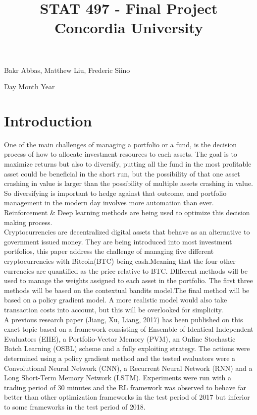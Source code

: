 \documentclass[a4paper,12pt]{article}
\title{
{STAT 497 - Final Project} \\
{\large Concordia University} \\
}
\date{}
\begin{document}
\begin{titlingpage}
  \maketitle
  \centering
  \vfill
  {\large{Bakr Abbas, Matthew Liu, Frederic Siino}} \par
  {\large{Day Month Year}}
\end{titlingpage}

\newpage

\section{Introduction}
One of the main challenges of managing a portfolio or a fund, is the decision process of how to allocate investment resources to each assets. The goal is to maximize returns but also to diversify, putting all the fund in the most profitable asset could be beneficial in the short run, but the possibility of that one asset crashing in value is larger than the possibility of multiple assets crashing in value. So diversifying is important to hedge against that outcome, and portfolio management in the modern day involves more automation than ever. Reinforcement \& Deep learning methods are being used to optimize this decision making process. \\

Cryptocurrencies are decentralized digital assets that behave as an alternative to government issued money. They are being introduced into most investment portfolios, this paper address the challenge of managing five different cryptocurrencies with Bitcoin(BTC) being cash.Meaning that the four other currencies are quantified as the price relative to BTC.  DIfferent methods will be used to manage the weights assigned to each asset in the portfolio. The first three methods will be based on the contextual bandits model.The final method will be based on a policy gradient model. A more realistic model would also take transaction costs into account, but this will be overlooked for simplicity. \\

A previous research paper (Jiang, Xu, Liang, 2017) has been published on this exact topic based on a framework consisting of Ensemble of Identical Independent Evaluators (EIIE), a Portfolio-Vector Memory (PVM), an Online Stochastic Batch Learning (OSBL) scheme and a fully exploiting strategy. The actions were determined using a policy gradient method and the tested evaluators were a Convolutional Neural Network (CNN), a Recurrent Neural Network (RNN) and a Long Short-Term Memory Network (LSTM). Experiments were run with a trading period of 30 minutes and the RL framework was observed to behave far better than other optimization frameworks in the test period of 2017 but inferior to some frameworks in the test period of 2018. \\
\end{document}
